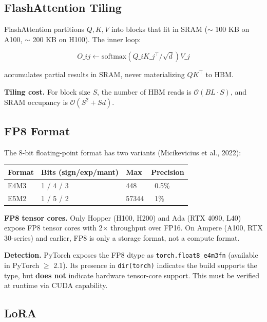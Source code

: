 \subsection{FlashAttention Tiling}

FlashAttention partitions $Q, K, V$ into blocks that fit in SRAM ($\sim$ 100 KB 
on A100, $\sim$ 200 KB on H100). The inner loop:

\[
O\_{ij} \leftarrow \text{softmax}(Q\_i K\_j^\top / \sqrt{d}) V\_j
\tag{3.3}
\]

accumulates partial results in SRAM, never materializing $QK^\top$ to HBM.

\textbf{Tiling cost.} For block size $S$, the number of HBM reads is 
$\mathcal{O}(BL \cdot S)$, and SRAM occupancy is $\mathcal{O}(S^2 + Sd)$.

\subsection{FP8 Format}

The 8-bit floating-point format has two variants (Micikevicius et al., 2022):

\begin{table}[H]
\centering
\small
\begin{tabular}{llll}
\toprule
\textbf{Format} & \textbf{Bits (sign/exp/mant)} & \textbf{Max} & \textbf{Precision} \\
\midrule
E4M3 & 1 / 4 / 3 & 448 & ~0.5\% \\
E5M2 & 1 / 5 / 2 & 57344 & ~1\% \\
\bottomrule
\end{tabular}
\end{table}

\textbf{FP8 tensor cores.} Only Hopper (H100, H200) and Ada (RTX 4090, L40) expose 
FP8 tensor cores with 2$\times$ throughput over FP16. On Ampere (A100, RTX 30-series) 
and earlier, FP8 is only a storage format, not a compute format.

\textbf{Detection.} PyTorch exposes the FP8 dtype as \texttt{torch.float8\_e4m3fn} 
(available in PyTorch $\ge$ 2.1). Its presence in \texttt{dir(torch)} indicates the 
build supports the type, but \textbf{does not} indicate hardware tensor-core 
support. This must be verified at runtime via CUDA capability.

\subsection{LoRA}

